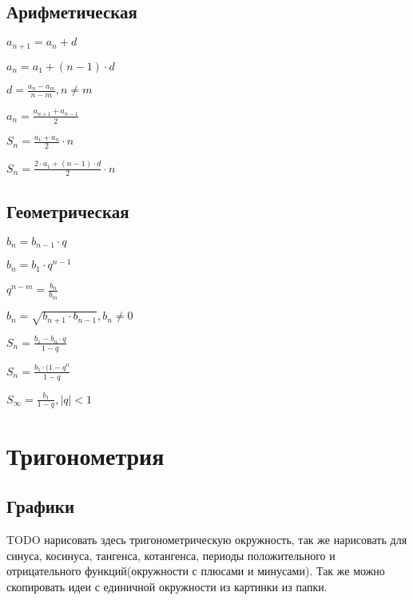 \subsection{Арифметическая}

$ a_{n+1} = a_n + d $

$ a_n = a_1 + (n-1)\cdot d $

$ d = \frac{a_n-a_m}{n-m}, n \neq m $

$ a_n = \frac{a_{n+1} + a_{n-1}}{2} $

$ S_n = \frac{a_1 + a_n}{2}\cdot n $

$ S_n = \frac{2\cdot a_1 + (n-1)\cdot d}{2}\cdot n $

\subsection{Геометрическая}

$ b_n = b_{n-1}\cdot q $

$ b_n = b_1 \cdot q^{n-1} $

$ q^{n-m} = \frac{b_n}{b_m} $

$ b_n = \sqrt{b_{n+1}\cdot b_{n-1}}, b_n \neq 0 $

$ S_n = \frac{b_1 - b_n\cdot q}{1-q} $

$ S_n = \frac{b_1\cdot (1 - q^n}{1-q} $

$ S_\infty = \frac{b_1}{1-q}, \left|q\right| < 1 $


\section{Тригонометрия}

\subsection{Графики}

TODO нарисовать здесь тригонометрическую окружность, так же нарисовать для синуса, косинуса, тангенса, котангенса, периоды положительного и отрицательного функций(окружности с плюсами и минусами). Так же можно скопировать идеи с единичной окружности из картинки из папки.

